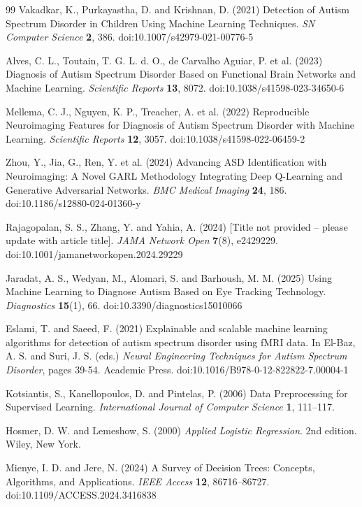 \documentclass[pdflatex,sn-nature]{sn-jnl}
\theoremstyle{thmstyleone}%
\theoremstyle{thmstyletwo}%
\theoremstyle{thmstylethree}%
\begin{document}
\begin{thebibliography}{99}
Vakadkar, K., Purkayastha, D. and Krishnan, D. (2021) Detection of Autism Spectrum Disorder in Children Using Machine Learning Techniques. \emph{SN Computer Science} \textbf{2}, 386. doi:10.1007/s42979-021-00776-5

Alves, C. L., Toutain, T. G. L. d. O., de Carvalho Aguiar, P. et al. (2023) Diagnosis of Autism Spectrum Disorder Based on Functional Brain Networks and Machine Learning. \emph{Scientific Reports} \textbf{13}, 8072. doi:10.1038/s41598-023-34650-6

Mellema, C. J., Nguyen, K. P., Treacher, A. et al. (2022) Reproducible Neuroimaging Features for Diagnosis of Autism Spectrum Disorder with Machine Learning. \emph{Scientific Reports} \textbf{12}, 3057. doi:10.1038/s41598-022-06459-2

Zhou, Y., Jia, G., Ren, Y. et al. (2024) Advancing ASD Identification with Neuroimaging: A Novel GARL Methodology Integrating Deep Q-Learning and Generative Adversarial Networks. \emph{BMC Medical Imaging} \textbf{24}, 186. doi:10.1186/s12880-024-01360-y

Rajagopalan, S. S., Zhang, Y. and Yahia, A. (2024) [Title not provided -- please update with article title]. \emph{JAMA Network Open} \textbf{7}(8), e2429229. doi:10.1001/jamanetworkopen.2024.29229

Jaradat, A. S., Wedyan, M., Alomari, S. and Barhoush, M. M. (2025) Using Machine Learning to Diagnose Autism Based on Eye Tracking Technology. \emph{Diagnostics} \textbf{15}(1), 66. doi:10.3390/diagnostics15010066

Eslami, T. and Saeed, F. (2021) Explainable and scalable machine learning algorithms for detection of autism spectrum disorder using fMRI data. In El-Baz, A. S. and Suri, J. S. (eds.) \emph{Neural Engineering Techniques for Autism Spectrum Disorder}, pages 39-54. Academic Press. doi:10.1016/B978-0-12-822822-7.00004-1

Kotsiantis, S., Kanellopoulos, D. and Pintelas, P. (2006) Data Preprocessing for Supervised Learning. \emph{International Journal of Computer Science} \textbf{1}, 111--117.

Hosmer, D. W. and Lemeshow, S. (2000) \emph{Applied Logistic Regression}. 2nd edition. Wiley, New York.

Mienye, I. D. and Jere, N. (2024) A Survey of Decision Trees: Concepts, Algorithms, and Applications. \emph{IEEE Access} \textbf{12}, 86716--86727. doi:10.1109/ACCESS.2024.3416838


\end{thebibliography}
\end{document}
